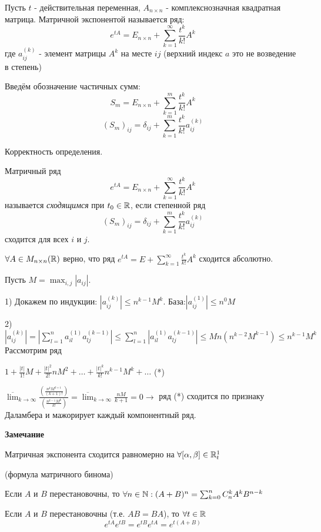 \Def Пусть $t$ - действительная переменная, $A_{n \times n}$ - комплекснозначная квадратная матрица. Матричной экспонентой называется ряд: $$e^{tA} = E_{n \times n} + \sum_{k=1}^{\infty} \frac{t^k}{k!} A^k$$
где $a_{ij}^{(k)}$ - элемент матрицы $A^k$ на месте $ij$ (верхний индекс $a$ это не возведение в степень)

Введём обозначение частичных сумм:
$$S_m = E_{n \times n} + \sum_{k=1}^{m} \frac{t^k}{k!} A^k$$
$$(S_m)_{ij} = \delta_{ij} + \sum_{k=1}^{m} \frac{t^k}{k!} a^{(k)}_{ij}$$

\par Корректность определения.

\Def Матричный ряд 
$$e^{tA} = E_{n \times n} + \sum_{k=1}^{\infty} \frac{t^k}{k!} A^k$$ 
называется \textit{сходящимся} при $t_0 \in \mathbb{R}$, если степенной ряд $$(S_m)_{ij} = \delta_{ij} + \sum_{k=1}^{m} \frac{t^k}{k!} a^{(k)}_{ij}$$ сходится для всех $i$ и $j$.

\Lemma $\forall A \in M_{n \times n}(\mathbb{R})$ верно, что ряд $e^{tA} = E + \sum_{k=1}^{\infty} \frac{t^k}{k!} A^k$ сходится абсолютно.

\Proof
Пусть $M = \max_{i, j}|a_{ij}|$. 

1) Докажем по индукции: $|a_{ij}^{(k)}| \leqslant n^{k-1}M^k$. База:$ |a_{ij}^{(1)}| \leqslant n^0 M$

2) $|a_{ij}^{(k)}| = |\sum_{l=1}^n a_{il}^{(1)}a_{lj}^{(k-1)}| \leqslant \sum_{l=1}^n |a_{il}^{(1)}a_{lj}^{(k-1)}| \leq M n (n^{k-2} M^{k-1}) \leqslant n^{k-1} M^k$\\
Рассмотрим ряд 

$1 + \frac{|t|}{1!} M + \frac{|t|^2}{2!} n M^2 + \dots + \frac{|t|^k}{k!} n^{k-1} M^k + \dots$ (*)

$\overline{\lim}_{k \rightarrow \infty} \frac{\left(\frac{n^k M^{k+1}}{(k+1)!}\right)}{\left(\frac{n^{k-1} M^k}{k!}\right)} = \overline{\lim}_{k \rightarrow \infty} \frac{nM}{k+1} = 0 \rightarrow$ ряд (*) сходится по признаку Даламбера и мажорирует каждый компонентный ряд.

\EndProof

\textbf{Замечание}

Матричная экспонента сходится равномерно на $\forall [\alpha, \beta] \in \mathbb{R}_t^1$

\Lemma (формула матричного бинома)

Если $A$ и $B$ перестановочны, то $\forall n \in \mathbb{N}: (A + B)^n = \sum_{k=0}^n C_n^k A^k B^{n-k}$

\Lemma Если $A$ и $B$ перестановочны (т.е. $AB = BA$), то $\forall t \in \mathbb{R}$
$$e^{tA} e^{tB} = e^{tB} e^{tA} = e^{t(A+B)}$$

